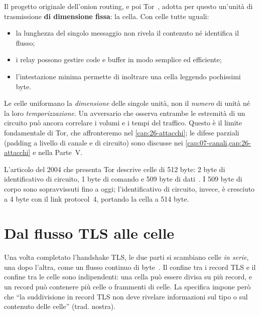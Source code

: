 Il progetto originale dell'onion routing, e poi Tor~\cite{dingledine2004tor}, adotta per questo un'unità di trasmissione \textbf{di dimensione fissa}: la cella. Con celle tutte uguali:
\begin{itemize}
  \item la lunghezza del singolo messaggio non rivela il contenuto né identifica il flusso;
  \item i relay possono gestire code e buffer in modo semplice ed efficiente;
  \item l'intestazione minima permette di inoltrare una cella leggendo pochissimi byte.
\end{itemize}

\begin{attenzione}
Le celle uniformano la \emph{dimensione} delle singole unità, non il \emph{numero} di unità né la loro \emph{temporizzazione}. Un avversario che osserva entrambe le estremità di un circuito può ancora correlare i volumi e i tempi del traffico. Questo è il limite fondamentale di Tor, che affronteremo nel \cref{cap:26-attacchi}; le difese parziali (padding a livello di canale e di circuito) sono discusse nei \cref{cap:07-canali,cap:26-attacchi} e nella Parte~V.
\end{attenzione}

\begin{storia}[512 byte]
L'articolo del 2004 che presenta Tor descrive celle di 512 byte: 2 byte di identificativo di circuito, 1 byte di comando e 509 byte di dati~\cite{dingledine2004tor}. I 509 byte di corpo sono sopravvissuti fino a oggi; l'identificativo di circuito, invece, è cresciuto a 4 byte con il link protocol~4, portando la cella a 514 byte.
\end{storia}

\section{Dal flusso TLS alle celle}\label{sec:celle-tls}

Una volta completato l'handshake TLS, le due parti si scambiano celle \emph{in serie}, una dopo l'altra, come un flusso continuo di byte~. Il confine tra i record TLS e il confine tra le celle sono indipendenti: una cella può essere divisa su più record, e un record può contenere più celle o frammenti di celle. La specifica impone però che \enquote{la suddivisione in record TLS non deve rivelare informazioni sul tipo o sul contenuto delle celle} (trad. nostra).

